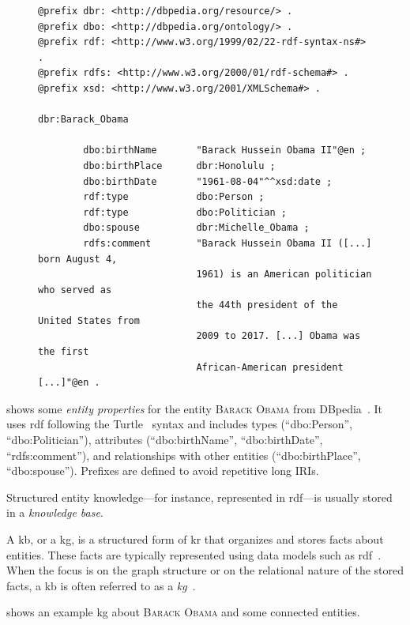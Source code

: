 \begin{figure}[h]
\centering
\begin{lstlisting}[style=rdfstyle,caption={Excerpt from the DBpedia~\cite{dbpedia,lehmann2015dbpedia,dbpedua_bizer_2009,dbpedia_auer_nucleus_2007} knowledge base entry of \textsc{Barack Obama}, in Turtle format~\cite{prudhommeaux2014turtle}.},label={lis:obama}]
@prefix dbr: <http://dbpedia.org/resource/> .
@prefix dbo: <http://dbpedia.org/ontology/> .
@prefix rdf: <http://www.w3.org/1999/02/22-rdf-syntax-ns#> .
@prefix rdfs: <http://www.w3.org/2000/01/rdf-schema#> .
@prefix xsd: <http://www.w3.org/2001/XMLSchema#> .

dbr:Barack_Obama

        dbo:birthName       "Barack Hussein Obama II"@en ;
        dbo:birthPlace      dbr:Honolulu ;
        dbo:birthDate       "1961-08-04"^^xsd:date ;
        rdf:type            dbo:Person ;
        rdf:type            dbo:Politician ;
        dbo:spouse          dbr:Michelle_Obama ;
        rdfs:comment        "Barack Hussein Obama II ([...] born August 4,
                            1961) is an American politician who served as
                            the 44th president of the United States from
                            2009 to 2017. [...] Obama was the first
                            African-American president [...]"@en .

\end{lstlisting}
\end{figure}

 shows some \emph{entity properties} for the entity \textsc{Barack Obama} from DBpedia~\cite{dbpedia,lehmann2015dbpedia,dbpedua_bizer_2009,dbpedia_auer_nucleus_2007}. It uses \ac{rdf} following the Turtle~\cite{prudhommeaux2014turtle} syntax and includes types (``dbo:Person'', ``dbo:Politician''), attributes (``dbo:birthName'', ``dbo:birthDate'', ``rdfs:comment''), and relationships with other entities (``dbo:birthPlace'', ``dbo:spouse''). Prefixes are defined to avoid repetitive long IRIs.

Structured entity knowledge---for instance, represented in \ac{rdf}---is usually stored in a \emph{knowledge base}.
%
\begin{definition}[\Acl{kb}]
    A \acf{kb}, or a \acf{kg}, is a structured form of \acl{kr} that organizes and stores facts about entities. 
    These facts are typically represented using data models such as \ac{rdf}~\cite{entityorientedsearch2018balog}.
    When the focus is on the graph structure or on the relational nature of the stored facts, a \acl{kb} is often referred to as a \emph{\acl{kg}}~\cite{entityorientedsearch2018balog}.
\end{definition}
 shows an example \acl{kg} about \textsc{Barack Obama} and some connected entities.

